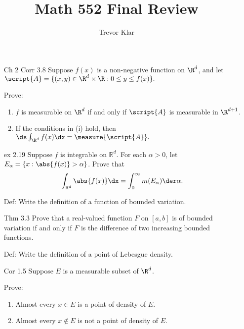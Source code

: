 \documentclass[letterpaper]{article}
\title{Math 552 \linebreak
Final Review}
\author{Trevor Klar}
\begin{document}
\maketitle

\begin{enumerate}
	\item[Ch 2 Corr 3.8] Suppose $f(x)$ is a non-negative function on $\R^d$, and let
	$\script{A}=\{(x,y)\in\R^d\times\R:0\leq y\leq f(x)\}.$
	
Prove:
	\begin{enumerate}[label=(\roman*)]
		\item $f$ is measurable on $\R^d$ if and only if $\script{A}$ is measurable in $\R^{d+1}$.
		\item If the conditions in (i) hold, then
		$\ds\int_{\R^d}f(x)\dx=\measure{\script{A}}.$
	\end{enumerate}

	
	\pagebreak
	\item[ex 2.19] Suppose $f$ is integrable on $\mathbb{R}^d$. For each $\alpha > 0$, let $E_\alpha=\{x: \abs{f(x)} > \alpha \}$. Prove that $$\int_{\mathbb{R}^d} \abs{f(x)}\dx = \int_0^\infty m(E_\alpha)\der\alpha.$$
	
	\pagebreak
	
	\item[Def:]	Write the definition of a function of bounded variation. \vspace{1.5in}
	
	\item[Thm 3.3] Prove that a real-valued function $F$ on $[a, b]$ is of bounded variation if and only if $F$ is the difference of two increasing bounded functions.
	
	\pagebreak
	\item[Def:]	Write the definition of a point of Lebesgue density. \vspace{1.5in}
	
	\item[Cor 1.5] Suppose $E$ is a measurable subset of $\R^d$. 
	
	Prove:
	\begin{enumerate}
		\item Almost every $x \in E$ is a point of density of $E$.
		\item Almost every $x \not\in E$ is not a point of density of $E$.
	\end{enumerate}
	

\end{enumerate}
\end{document}
